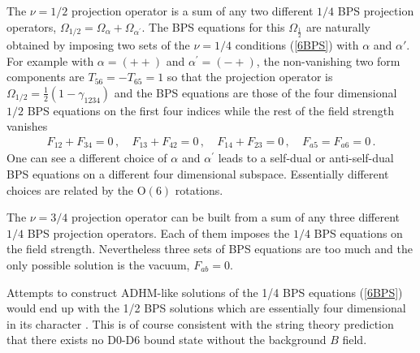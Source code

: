 \documentclass[a4paper,11pt]{article}
\newcommand{\const}{{\nu}}
\def\const{{\nu}}
\begin{document}
The $\const=1/2$ projection operator is a sum of any two different $1/4$ BPS projection operators,
$\Omega_{1/2}=\Omega_{\alpha}+\Omega_{\alpha^{\prime}}$. The BPS equations for this $\Omega_{\frac{1}{2}}$ are naturally obtained by imposing two
sets of the $\nu=1/4$ conditions (\ref{6BPS}) with $\alpha$ and $\alpha'$. For example with $\alpha=(++)$ and $\alpha^{\prime}=(-+)$, the
non-vanishing two form components are $T_{56}=-T_{65} = 1$ so that the projection operator is $\Omega_{1/2}=\frac{1}{2}(1- \gamma_{1234})$ and the
BPS equations are those  of the four dimensional $1/2$ BPS equations on the first four indices while the rest of the field strength vanishes
\begin{equation}
\begin{array}{cccc}
F_{12}+ F_{34}=0\,,~&F_{13}+ F_{42}=0\,,~&F_{14}+ F_{23}=0\,,~&F_{a5}=F_{a6}=0\,.
\end{array}
\end{equation}
One can see a different choice of $\alpha$ and $\alpha^{\prime}$ leads to a self-dual or anti-self-dual BPS equations on a different four
dimensional subspace. Essentially   different   choices are related by  the $\mbox{O}(6)$ rotations.

The $\const=3/4$ projection operator can be built from a sum of any three different $1/4$ BPS projection operators. Each of them imposes the $1/4$
BPS equations on the field strength. Nevertheless  three sets of BPS equations are too much and  the only possible solution is the vacuum,
$F_{ab}=0$.

Attempts to construct  ADHM-like  solutions  of the  1/4 BPS equations (\ref{6BPS})  would end up with the 1/2 BPS solutions which are essentially
four dimensional in its character \cite{JHPprivate}. This is of course consistent with the string theory prediction that there exists no D0-D6 bound
state without the background $B$ field.





\end{document}

